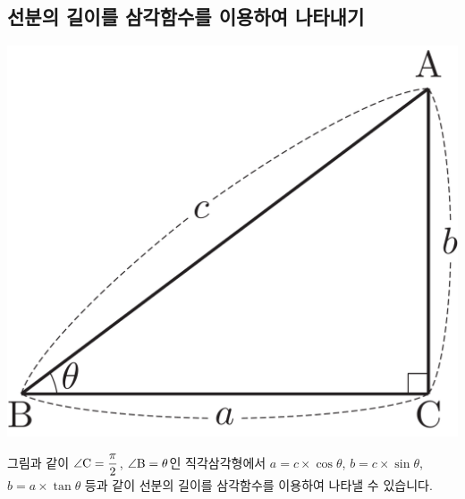 \subsection{선분의 길이를 삼각함수를 이용하여 나타내기}
\begin{center}
\includegraphics[scale=0.125]{pic0/pic159.pdf}
\end{center}그림과 같이 $\angle \mathrm{C} = \dfrac{\pi}{2}$, $\angle \mathrm{B} = \theta$인 직각삼각형에서 $a = c\times \cos\theta$, $b = c\times \sin\theta$, $b = a\times\tan\theta$ 등과 같이 선분의 길이를 삼각함수를 이용하여 나타낼 수 있습니다.

